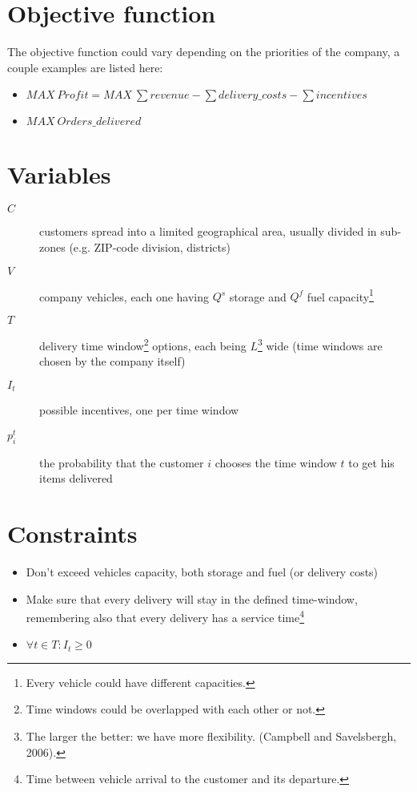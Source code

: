 \documentclass[10pt, letterpaper]{article}
\begin{document}
\section{Objective function}
The objective function could vary depending on the priorities of the company,
a couple examples are listed here:
\begin{itemize}
	\item \( MAX\ Profit = MAX\ \sum revenue -
								\sum delivery\_costs -
								\sum incentives \)

	\item \( MAX\ Orders\_delivered \)
\end{itemize}

\section{Variables}
\begin{description}
	\item[\(C\)] 
		customers spread into a limited geographical area, usually divided in
		sub-zones (e.g. ZIP-code division, districts)
	
	\item[\(V\)]
		company vehicles, each one having \(Q^{s}\) storage and \(Q^{f}\) 
		fuel capacity\footnote{Every vehicle could have different capacities.}

	\item[\(T\)]
		delivery time window\footnote{Time windows could be overlapped with 
		each other or not.} options, each being \(L\)\footnote{The larger 
		the better: we have more flexibility. (Campbell and Savelsbergh, 2006).}
		wide (time windows are chosen by the company itself)

	\item[\(I_{t}\)]
		possible incentives, one per time window

	\item[\(p_{i}^{t}\)]
		the probability that the customer \(i\) chooses the time window \(t\) 
		to get his items delivered
\end{description}

\section{Constraints}
\begin{itemize}
	\item 
		Don't exceed vehicles capacity, both storage and fuel (or delivery
		costs)

	\item 
		Make sure that every delivery will stay in the defined time-window,
		remembering also that every delivery has a service time\footnote{Time 
		between vehicle arrival to the customer and its departure.}

	\item
		\( \forall t \in T : I_{t} \geq 0 \)
\end{itemize}
\end{document}
